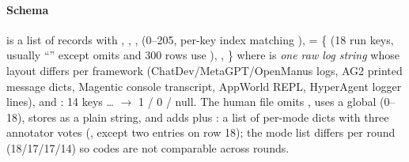 \paragraph{Schema}  is a list of records with , , ,  (0--205, per-key index matching ),  = \{ (18 run keys, usually ``'' except  omits  and 300  rows use ), , \} where  is \emph{one raw log string} whose layout differs per framework (ChatDev/MetaGPT/OpenManus logs, AG2 printed message dicts, Magentic console transcript, AppWorld REPL, HyperAgent logger lines), and : 14 keys \ldots{} $\to$ 1 / 0 / null. The human file omits , uses a global  (0--18), stores  as a plain string, and adds  plus : a list of per-mode dicts with three annotator votes (, except two  entries on row 18); the mode list differs per round (18/17/17/14) so codes are not comparable across rounds.

